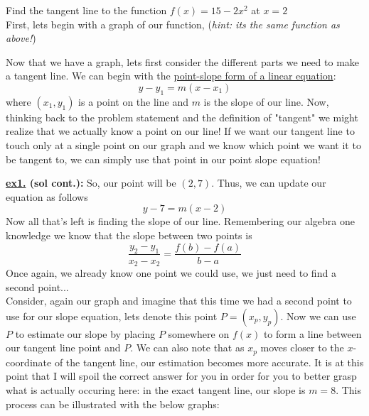 \documentclass[addpoints]{exam}
\begin{document}
\begin{questions}
	\question Find the tangent line to the function $f(x)=15-2x^2$ at $x=2$ \\
	\ifprintanswers
		First, lets begin with a graph of our function, (\textit{hint: its the same function as above!})
		\vspace{0.1in}
		\newline
		\begin{minipage}{0.45\linewidth}
		\end{minipage}
		\hfill
		\begin{minipage}{0.45\linewidth}
			Now that we have a graph, lets first consider the different parts we need to make a tangent line. We can begin with the \underline{point-slope form of a linear equation}:
			\[y-y_1 = m(x-x_1)\]
			where $(x_1, y_1)$ is a point on the line and $m$ is the slope of our line. Now, thinking back to the problem statement and the definition of "tangent" we might realize that we actually know a point on our line! If we want our tangent line to touch only at a single point on our graph and we know which point we want it to be tangent to, we can simply use that point in our point slope equation!
		\end{minipage}
		\newpage
		\large\textbf{\underline{ex1.} (sol cont.):} \normalsize So, our point will be $({2}, {7})$. Thus, we can update our equation as follows
		\[
			y-7 = m(x-2)
		\]
		Now all that's left is finding the slope of our line. Remembering our algebra one knowledge we know that the slope between two points is
		\[
			\frac{y_2-y_1}{x_2-x_2} = \frac{f(b)-f(a)}{b-a}
		\]
		Once again, we already know one point we could use, we just need to find a second point...\\
		Consider, again our graph and imagine that this time we had a second point to use for our slope equation, lets denote this point $P = (x_p, y_p)$. Now we can use $P$ to estimate our slope by placing $P$ somewhere on $f(x)$ to form a line between our tangent line point and $P$. We can also note that as $x_p$ moves closer to the $x$-coordinate of the tangent line, our estimation becomes more accurate. It is at this point that I will spoil the correct answer for you in order for you to better grasp what is actually occuring here: in the exact tangent line, our slope is $m=8$. This process can be illustrated with the below graphs:

\end{questions}
\end{document}
